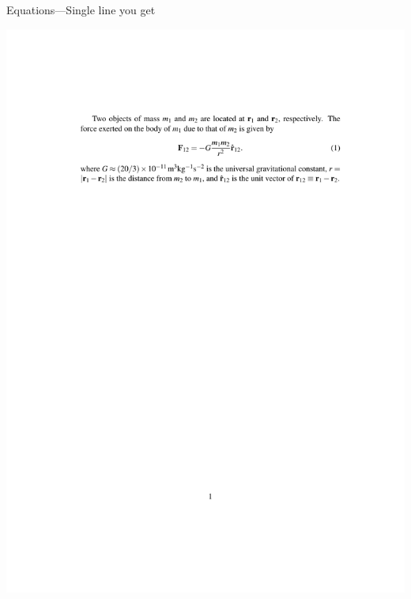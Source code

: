 \documentclass[12pt]{gshs_lecture}
\begin{document}
\begin{frame}[t]{Equations---Single line}\small
you get
\begin{center}
\begin{framed}
\includegraphics[width=\textwidth,trim={0cm 18cm 0cm 4cm},clip]{./test_article/article009.pdf}
\end{framed}
\end{center}
\end{frame}
\end{document}
